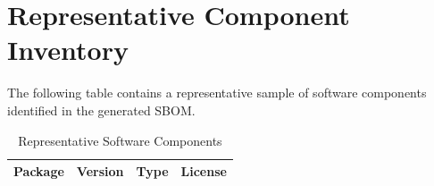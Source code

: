 \vspace{0.4cm}


\section{Representative Component Inventory}

The following table contains a representative sample of software components identified in the generated SBOM.

\small
\renewcommand{\arraystretch}{1.2}

\begin{longtable}{p{4.5cm}p{2.3cm}p{2cm}p{3.5cm}}
\caption{Representative Software Components} \\
\toprule
\rowcolor{ZWPrimary}
\textbf{\color{white}Package} & \textbf{\color{white}Version} & \textbf{\color{white}Type} & \textbf{\color{white}License} \\
\midrule
\endfirsthead


\end{longtable}
